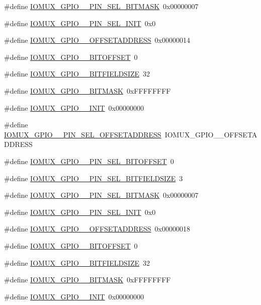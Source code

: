 \begin{DoxyCompactItemize}
\item 
\#define \hyperlink{a00560_a83720f77d39e9d38bc223416c074c23a}{IOMUX\_\-GPIO\_\_\-PIN\_\-SEL\_\-BITMASK}~0x00000007
\item 
\#define \hyperlink{a00560_a62d124e78a4294222837bb2c19a7db07}{IOMUX\_\-GPIO\_\_\-PIN\_\-SEL\_\-INIT}~0x0
\item 
\#define \hyperlink{a00560_ad472a0f612e7aae13258afae3605ef8f}{IOMUX\_\-GPIO\_\_\-OFFSETADDRESS}~0x00000014
\item 
\#define \hyperlink{a00560_a95c2c21d6d51852cc4ae8d233ca7546e}{IOMUX\_\-GPIO\_\_\-BITOFFSET}~0
\item 
\#define \hyperlink{a00560_a6880755a53f873b46ed7333659963843}{IOMUX\_\-GPIO\_\_\-BITFIELDSIZE}~32
\item 
\#define \hyperlink{a00560_a3c1a3c8598ebdefca3a427e4c0a3f46c}{IOMUX\_\-GPIO\_\_\-BITMASK}~0xFFFFFFFF
\item 
\#define \hyperlink{a00560_ae194a87a643f5eadefd04930bad86d68}{IOMUX\_\-GPIO\_\_\-INIT}~0x00000000
\item 
\#define \hyperlink{a00560_a0af36beaf203c1b78cd78c66167daba6}{IOMUX\_\-GPIO\_\_\-PIN\_\-SEL\_\-OFFSETADDRESS}~IOMUX\_\-GPIO\_\_\-OFFSETADDRESS
\item 
\#define \hyperlink{a00560_afb321429488dc860f4272f99ce3abee5}{IOMUX\_\-GPIO\_\_\-PIN\_\-SEL\_\-BITOFFSET}~0
\item 
\#define \hyperlink{a00560_a9949b81f75dbe003e5750b09136fb8c5}{IOMUX\_\-GPIO\_\_\-PIN\_\-SEL\_\-BITFIELDSIZE}~3
\item 
\#define \hyperlink{a00560_ab8e4e3eda13169c14bdc0115385e4d17}{IOMUX\_\-GPIO\_\_\-PIN\_\-SEL\_\-BITMASK}~0x00000007
\item 
\#define \hyperlink{a00560_a92fc3843a91f7711b312e0eb802184ee}{IOMUX\_\-GPIO\_\_\-PIN\_\-SEL\_\-INIT}~0x0
\item 
\#define \hyperlink{a00560_a5bd880f0494779c06144e6eed8df280a}{IOMUX\_\-GPIO\_\_\-OFFSETADDRESS}~0x00000018
\item 
\#define \hyperlink{a00560_a32d84bb26e19e49618d50d8ff035965f}{IOMUX\_\-GPIO\_\_\-BITOFFSET}~0
\item 
\#define \hyperlink{a00560_ad2f7eb3beb4b510d520b8af514dd6dc4}{IOMUX\_\-GPIO\_\_\-BITFIELDSIZE}~32
\item 
\#define \hyperlink{a00560_a571fa2d79e967d4e2185d615ddefad41}{IOMUX\_\-GPIO\_\_\-BITMASK}~0xFFFFFFFF
\item 
\#define \hyperlink{a00560_a58eb994ce173a655e8dfc0570bbe9d6d}{IOMUX\_\-GPIO\_\_\-INIT}~0x00000000

\end{DoxyCompactItemize}
